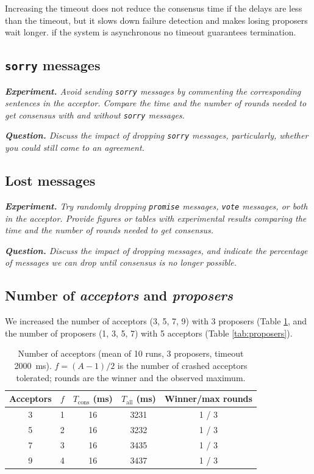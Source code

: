 \documentclass[a4paper, 10pt]{article}
\begin{document}
\noindent Increasing the timeout does not reduce the consensus time if the delays are less than the timeout, but it slows down failure detection and makes losing proposers wait longer. if the system is asynchronous no timeout guarantees termination.

\subsection{\texttt{sorry} messages}

\textit{\textbf{Experiment.} Avoid sending \texttt{sorry} messages by commenting the corresponding sentences in the acceptor. Compare the time and the number of rounds needed to get consensus with and without \texttt{sorry} messages.} 

{\setlength{\parskip}{10pt}\noindent\textit{\textbf{Question.} Discuss the impact of dropping \texttt{sorry} messages, particularly, whether you could still come to an agreement.}}

\subsection{Lost messages}

\textit{\textbf{Experiment.} Try randomly dropping \texttt{promise} messages, \texttt{vote} messages, or both in the acceptor. Provide figures or tables with experimental results comparing the time and the number of rounds needed to get consensus.}
 
{\setlength{\parskip}{10pt}\noindent\textit{\textbf{Question.} Discuss the impact of dropping messages, and indicate the percentage of messages we can drop until consensus is no longer possible.}}

\subsection{Number of \textit{acceptors} and \textit{proposers}}

We increased the number of acceptors (3, 5, 7, 9) with 3 proposers (Table \ref{tab:acceptors}, and the number of proposers (1, 3, 5, 7) with 5 acceptors (Table \ref{tab:proposers}). 

\begin{table}[htbp]
\centering
\small
\begin{tabular}{c|c|c|c|c}
\hline
Acceptors & $f$ & $T_{\mathrm{cons}}$ (ms) & $T_{\mathrm{all}}$ (ms) & Winner/max rounds \\
\hline
3 & 1 & 16 & 3231 & 1 / 3 \\
5 & 2 & 16 & 3232 & 1 / 3 \\
7 & 3 & 16 & 3435 & 1 / 3 \\
9 & 4 & 16 & 3437 & 1 / 3 \\
\hline
\end{tabular}
\caption{Number of acceptors (mean of 10 runs, 3 proposers, timeout 2000~ms).
$f=(A-1)/2$ is the number of crashed acceptors tolerated; rounds are the
winner and the observed maximum.}
\label{tab:acceptors}
\end{table}
\end{document}
